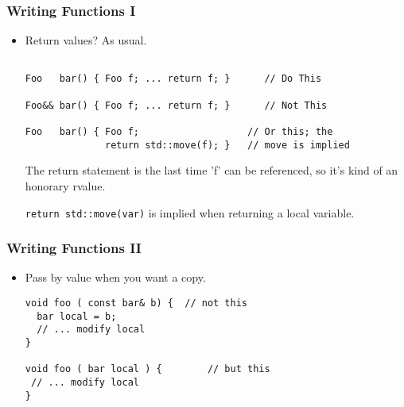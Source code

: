 
\begin{frame}[fragile]
\frametitle{Writing Functions I}
\begin{itemize}
\item Return values?  As usual.
{\scriptsize
\begin{verbatim}

Foo   bar() { Foo f; ... return f; }      // Do This

Foo&& bar() { Foo f; ... return f; }      // Not This

Foo   bar() { Foo f;                   // Or this; the
              return std::move(f); }   // move is implied

\end{verbatim}
}
The return statement is the last time 'f' can be referenced,
so it's kind of an honorary rvalue.

\texttt{return std::move(var)} is implied when returning a local variable.

\end{itemize}

\end{frame}



\begin{frame}[fragile]
\frametitle{Writing Functions II}
\begin{itemize}
\item Pass by value when you want a copy.
{\scriptsize
\begin{verbatim}
void foo ( const bar& b) {  // not this
  bar local = b;
  // ... modify local
}

void foo ( bar local ) {        // but this
 // ... modify local 
}
\end{verbatim}
}
\pause
\begin{center}
\end{center}
\end{itemize}

\end{frame}



